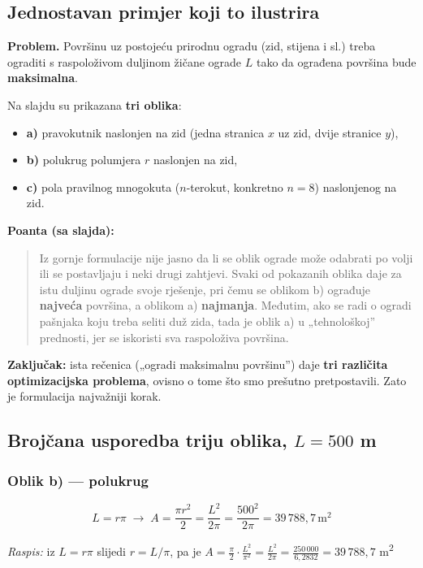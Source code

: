 \subsection{Jednostavan primjer koji to ilustrira}

\textbf{Problem.} Površinu uz postojeću prirodnu ogradu (zid, stijena i sl.)
treba ograditi s raspoloživom duljinom žičane ograde $L$ tako da ograđena
površina bude \textbf{maksimalna}.

Na slajdu su prikazana \textbf{tri oblika}:
\begin{itemize}
  \item \textbf{a)} pravokutnik naslonjen na zid (jedna stranica $x$ uz zid,
        dvije stranice $y$),
  \item \textbf{b)} polukrug polumjera $r$ naslonjen na zid,
  \item \textbf{c)} pola pravilnog mnogokuta ($n$-terokut, konkretno $n = 8$)
        naslonjenog na zid.
\end{itemize}

\textbf{Poanta (sa slajda):}

\begin{quote}
Iz gornje formulacije nije jasno da li se oblik ograde može odabrati po volji
ili se postavljaju i neki drugi zahtjevi. Svaki od pokazanih oblika daje za istu
duljinu ograde svoje rješenje, pri čemu se oblikom b) ograđuje \textbf{najveća}
površina, a oblikom a) \textbf{najmanja}. Međutim, ako se radi o ogradi pašnjaka
koju treba seliti duž zida, tada je oblik a) u „tehnološkoj” prednosti, jer se
iskoristi sva raspoloživa površina.
\end{quote}

\textbf{Zaključak:} ista rečenica („ogradi maksimalnu površinu”) daje
\textbf{tri različita optimizacijska problema}, ovisno o tome što smo prešutno
pretpostavili. Zato je formulacija najvažniji korak.

\subsection{Brojčana usporedba triju oblika, $L = 500$ m}

\subsubsection*{Oblik b) --- polukrug}
\[
L = r\pi \;\to\; A = \frac{\pi r^2}{2} = \frac{L^2}{2\pi} = \frac{500^2}{2\pi}
= 39\,788{,}7\,\text{m}^2
\]

\emph{Raspis:} iz $L = r\pi$ slijedi $r = L/\pi$, pa je
$A = \tfrac{\pi}{2}\cdot\tfrac{L^2}{\pi^2} = \tfrac{L^2}{2\pi}
= \tfrac{250\,000}{6{,}2832} = 39\,788{,}7$ m\textsuperscript{2} \checkmark

